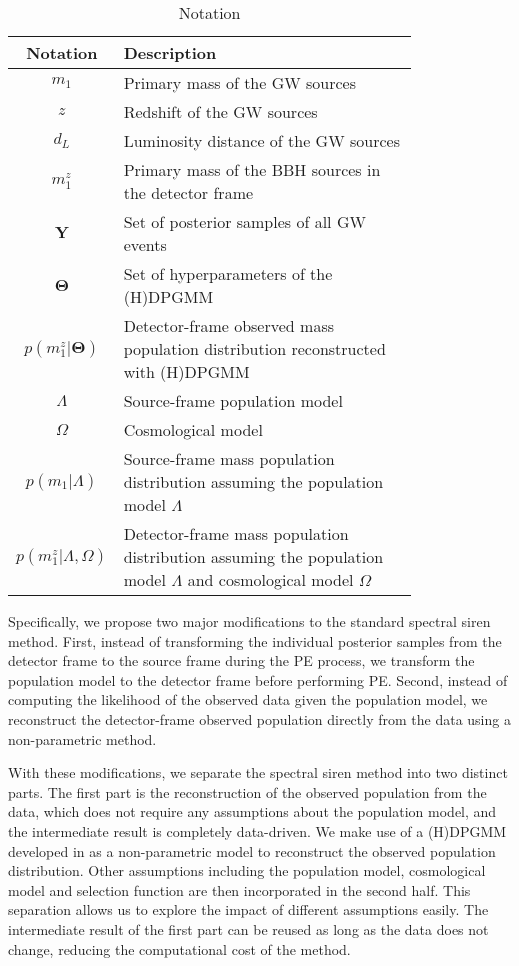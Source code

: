 \documentclass[aps,prd,twocolumn,superscriptaddress,preprintnumbers,nofootinbib,hidelinks]{revtex4-2}
\begin{document}
\begin{table}
    \label{tab:notation}
    \caption{Notation}
    \begin{ruledtabular}
        \begin{tabular}{c>{\raggedright\arraybackslash}p{0.8\linewidth}}
            Notation & Description \\
            \hline
            $m_1$ & Primary mass of the \ac{GW} sources \\
            $z$ & Redshift of the \ac{GW} sources \\
            $d_L$ & Luminosity distance of the \ac{GW} sources \\
            $m^z_1$ & Primary mass of the \ac{BBH} sources in the detector frame \\
            $\mathbf{Y}$ & Set of posterior samples of all \ac{GW} events \\
            $\mathbf{\Theta}$ & Set of hyperparameters of the \ac{(H)DPGMM} \\
            $p(m^z_1|\mathbf{\Theta})$ & Detector-frame observed mass population distribution reconstructed with \ac{(H)DPGMM} \\
            $\Lambda$ & Source-frame population model \\
            $\Omega$ & Cosmological model \\
            $p(m_1|\Lambda)$ & Source-frame mass population distribution assuming the population model $\Lambda$ \\
            $p(m^z_1|\Lambda, \Omega)$ & Detector-frame mass population distribution assuming the population model $\Lambda$ and cosmological model $\Omega$ \\
        \end{tabular}
        \end{ruledtabular}
\end{table}

Specifically, we propose two major modifications to the standard spectral siren method.
First, instead of transforming the individual posterior samples from the detector frame to the source frame during the \ac{PE} process, we transform the population model to the detector frame before performing \ac{PE}.
Second, instead of computing the likelihood of the observed data given the population model, we reconstruct the detector-frame observed population directly from the data using a non-parametric method.

With these modifications, we separate the spectral siren method into two distinct parts.
The first part is the reconstruction of the observed population from the data, which does not require any assumptions about the population model, and the intermediate result is completely data-driven.
We make use of a \ac{(H)DPGMM} developed in \citet{Rinaldi:2021bhm} as a non-parametric model to reconstruct the observed population distribution.
Other assumptions including the population model, cosmological model and selection function are then incorporated in the second half.
This separation allows us to explore the impact of different assumptions easily.
The intermediate result of the first part can be reused as long as the data does not change, reducing the computational cost of the method.
\end{document}
